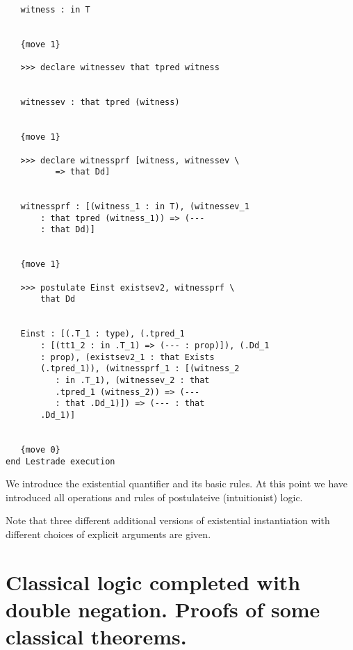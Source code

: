 \documentclass[12pt]{article}
\begin{document}
\begin{verbatim}
   witness : in T


   {move 1}

   >>> declare witnessev that tpred witness


   witnessev : that tpred (witness)


   {move 1}

   >>> declare witnessprf [witness, witnessev \
          => that Dd]


   witnessprf : [(witness_1 : in T), (witnessev_1 
       : that tpred (witness_1)) => (--- 
       : that Dd)]


   {move 1}

   >>> postulate Einst existsev2, witnessprf \
       that Dd


   Einst : [(.T_1 : type), (.tpred_1 
       : [(tt1_2 : in .T_1) => (--- : prop)]), (.Dd_1 
       : prop), (existsev2_1 : that Exists 
       (.tpred_1)), (witnessprf_1 : [(witness_2 
          : in .T_1), (witnessev_2 : that 
          .tpred_1 (witness_2)) => (--- 
          : that .Dd_1)]) => (--- : that 
       .Dd_1)]


   {move 0}
end Lestrade execution
\end{verbatim}

We introduce the existential quantifier and its basic rules.  At this point we have introduced all operations and rules of postulateive (intuitionist) logic.

Note that three different additional versions of existential instantiation with different choices of explicit arguments are given.

\section{Classical logic completed with double negation.  Proofs of some classical theorems.}
\end{document}
